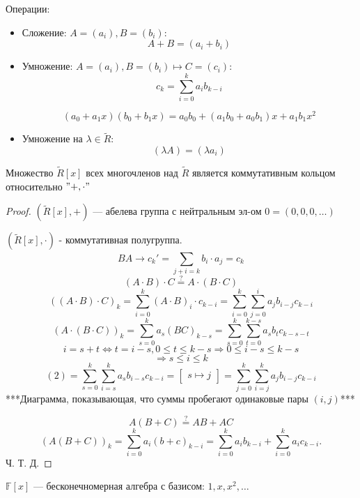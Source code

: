   Операции:
\begin{itemize}
  \item Сложение: $A = (a_i), B = (b_i)$:
    \[
    A + B = (a_i + b_i)
    \]
  \item Умножение: $A = (a_i), B = (b_i) \mapsto C = (c_i)$:
    \[
    c_k = \sum_{i = 0}^{k} a_i b_{k - i} 
    \]
    \begin{example}
      \[
        (a_0 + a_1 x)(b_0 + b_1 x) = a_0b_0 + (a_1b_0 + a_0b_1)x + a_1b_1x^{2}
      \]
    \end{example}
  \item Умножение на $\lambda \in \tilde{R}$:
    \[
      (\lambda A) = (\lambda a_i)
    \]
\end{itemize}
\begin{statement}
\label{statement:01_1}
Множество $\tilde{R}[x]$ всех многочленов над $\tilde{R}$ является коммутативным кольцом относительно $"+, \cdot"$
\end{statement}
\begin{proof}
$(\tilde{R}[x], +)$ --- абелева группа с нейтральным эл-ом $0 = (0, 0, 0, \ldots )$

$(\tilde{R}[x], \cdot)$ - коммутативная полугруппа.
\[
  BA \rightarrow c_k' = \sum_{j + i = k}^{} b_i \cdot a_j = c_k
\]
\[
  (A\cdot B) \cdot C \overset{?}{=}  A \cdot (B \cdot C)
\]
\begin{equation}
  ((A \cdot B) \cdot C)_k = \sum_{i = 0}^{k} (A \cdot B)_i \cdot c_{k - i} = \sum_{i = 0}^{k} \sum_{j = 0}^{i} a_j b_{i - j} c_{k - i}
\end{equation}
\begin{equation}
  (A \cdot (B \cdot C))_k = \sum_{s = 0}^{k} a_s (BC)_{k - s} = \sum_{s = 0}^{k} \sum_{t = 0}^{k - s} a_s b_t c_{k - s - t}
\end{equation}
\[
  i = s + t \iff t = i - s, 0 \leq t \leq k - s \Rightarrow 0 \leq i - s \leq k - s
\]
\[
 \Rightarrow s \leq i \leq k
\]
\[
  (2) = \sum_{s = 0}^{k} \sum_{i = s}^{k}a_s b_{i - s} c_{k - i} = \begin{bmatrix} s \mapsto j \end{bmatrix} = \sum_{j = 0}^{k} \sum_{i = j}^{k} a_j b_{i - j} c_{k - i}
\]
***Диаграмма, показывающая, что суммы пробегают одинаковые пары $(i, j)$***

\[
A(B + C) \overset{?}{=} AB + AC
\]
\[
  (A(B + C))_k = \sum_{i = 0}^{k} a_i(b + c)_{k - i} = \sum_{i = 0}^{k} a_i b_{k - i} + \sum_{i = 0}^{k} a_{i} c_{k - i}.
\]
Ч. Т. Д.
\end{proof}
\begin{consequence}
$\mathbb{F}[x]$ --- бесконечномерная алгебра с базисом: $1, x, x^{2}, \ldots$
\end{consequence}

